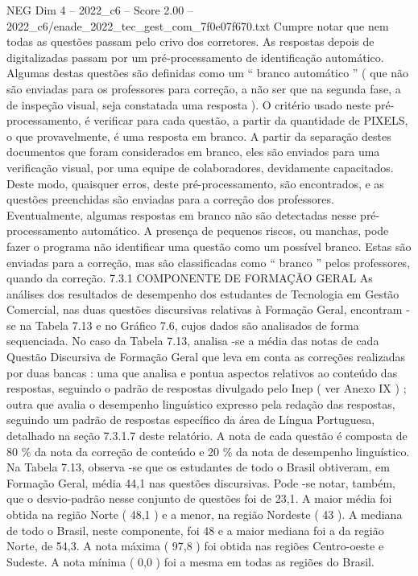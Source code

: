 \begin{textsample}{NEG Dim 4 – 2022\_c6 – Score 2.00 – 2022\_c6/enade\_2022\_tec\_gest\_com\_7f0e07f670.txt}
Cumpre notar que nem todas as questões passam pelo crivo dos corretores.
As respostas depois de digitalizadas passam por um pré-processamento de identificação automático.
Algumas destas questões são definidas como um “ branco automático ” ( que não são enviadas para os professores para correção, a não ser que na segunda fase, a de inspeção visual, seja constatada uma resposta ).
O critério usado neste pré-processamento, é verificar para cada questão, a partir da quantidade de PIXELS, o que provavelmente, é uma resposta em branco.
A partir da separação destes documentos que foram considerados em branco, eles são enviados para uma verificação visual, por uma equipe de colaboradores, devidamente capacitados.
Deste modo, quaisquer erros, deste pré-processamento, são encontrados, e as questões preenchidas são enviadas para a correção dos professores.
Eventualmente, algumas respostas em branco não são detectadas nesse pré-processamento automático.
A presença de pequenos riscos, ou manchas, pode fazer o programa não identificar uma questão como um possível branco.
Estas são enviadas para a correção, mas são classificadas como “ branco ” pelos professores, quando da correção. 7.3.1 COMPONENTE DE FORMAÇÃO GERAL As análises dos resultados de desempenho dos estudantes de Tecnologia em Gestão Comercial, nas duas questões discursivas relativas à Formação Geral, encontram -se na Tabela 7.13 e no Gráfico 7.6, cujos dados são analisados de forma sequenciada.
No caso da Tabela 7.13, analisa -se a média das notas de cada Questão Discursiva de Formação Geral que leva em conta as correções realizadas por duas bancas : uma que analisa e pontua aspectos relativos ao conteúdo das respostas, seguindo o padrão de respostas divulgado pelo Inep ( ver Anexo IX ) ; outra que avalia o desempenho linguístico expresso pela redação das respostas, seguindo um padrão de respostas específico da área de Língua Portuguesa, detalhado na seção 7.3.1.7 deste relatório.
A nota de cada questão é composta de 80 \% da nota da correção de conteúdo e 20 \% da nota de desempenho linguístico.
Na Tabela 7.13, observa -se que os estudantes de todo o Brasil obtiveram, em Formação Geral, média 44,1 nas questões discursivas.
Pode -se notar, também, que o desvio-padrão nesse conjunto de questões foi de 23,1.
A maior média foi obtida na região Norte ( 48,1 ) e a menor, na região Nordeste ( 43 ).
A mediana de todo o Brasil, neste componente, foi 48 e a maior mediana foi a da região Norte, de 54,3.
A nota máxima ( 97,8 ) foi obtida nas regiões Centro-oeste e Sudeste.
A nota mínima ( 0,0 ) foi a mesma em todas as regiões do Brasil.

\end{textsample}
